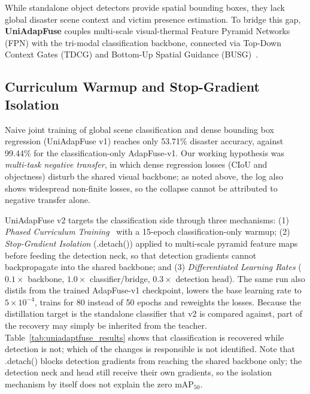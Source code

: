While standalone object detectors provide spatial bounding boxes, they lack global disaster scene context and victim presence estimation. To bridge this gap, \textbf{UniAdapFuse} couples multi-scale visual-thermal Feature Pyramid Networks (FPN) with the tri-modal classification backbone, connected via Top-Down Context Gates (TDCG) and Bottom-Up Spatial Guidance (BUSG)~\cite{perez2018film}.

\subsection{Curriculum Warmup and Stop-Gradient Isolation}

Naive joint training of global scene classification and dense bounding box regression (UniAdapFuse v1) reaches only 53.71\% disaster accuracy, against 99.44\% for the classification-only AdapFuse-v1. Our working hypothesis was \textit{multi-task negative transfer}, in which dense regression losses (CIoU and objectness) disturb the shared visual backbone; as noted above, the log also shows widespread non-finite losses, so the collapse cannot be attributed to negative transfer alone.

UniAdapFuse v2 targets the classification side through three mechanisms: (1) \textit{Phased Curriculum Training}~\cite{bengio2009curriculum} with a 15-epoch classification-only warmup; (2) \textit{Stop-Gradient Isolation} (.detach()) applied to multi-scale pyramid feature maps before feeding the detection neck, so that detection gradients cannot backpropagate into the shared backbone; and (3) \textit{Differentiated Learning Rates} ($0.1\times$ backbone, $1.0\times$ classifier/bridge, $0.3\times$ detection head). The same run also distils from the trained AdapFuse-v1 checkpoint, lowers the base learning rate to $5\times10^{-4}$, trains for 80 instead of 50 epochs and reweights the losses. Because the distillation target is the standalone classifier that v2 is compared against, part of the recovery may simply be inherited from the teacher. Table~\ref{tab:uniadaptfuse_results} shows that classification is recovered while detection is not; which of the changes is responsible is not identified. Note that .detach() blocks detection gradients from reaching the shared backbone only; the detection neck and head still receive their own gradients, so the isolation mechanism by itself does not explain the zero $\mathrm{mAP}_{50}$.

